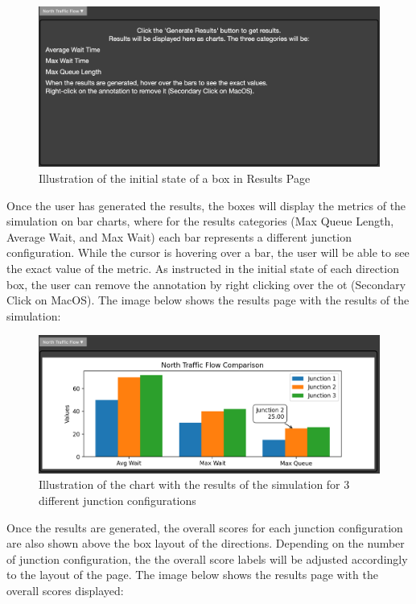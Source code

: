 \documentclass{article}
\begin{document}
        \begin{figure}[H]
            \centering
            \includegraphics[width=\textwidth]{results1.png}
            \caption{Illustration of the initial state of a box in Results Page}
            \label{fig:results1}
        \end{figure}

        Once the user has generated the results, the boxes will display the metrics of the simulation on bar charts, where for the results categories (Max Queue Length, Average Wait, and Max Wait)
        each bar represents a different junction configuration. While the cursor is hovering over a bar, the user will be able to see the exact value of the metric. As instructed in the initial state 
        of each direction box, the user can remove the annotation by right clicking over the ot (Secondary Click on MacOS). The image below shows the results page with the results of the simulation:

        \begin{figure}[H]
            \centering
            \includegraphics[width=\textwidth]{results2.png}
            \caption{Illustration of the chart with the results of the simulation for 3 different junction configurations} 
            \label{fig:results2}
        \end{figure}

        Once the results are generated, the overall scores for each junction configuration are also shown above the box layout of the directions. Depending on the number of junction configuration, the 
        the overall score labels will be adjusted accordingly to the layout of the page. The image below shows the results page with the overall scores displayed:
\end{document}

